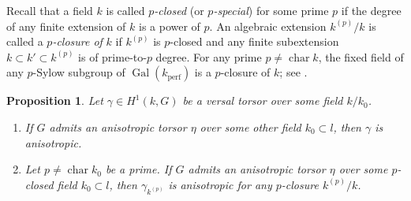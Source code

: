 \documentclass[12pt]{amsart}
\numberwithin{equation}{section}
\newtheorem{proposition}[theorem]{Proposition}
\theoremstyle{definition}
\newcommand{\Gal}{\operatorname{Gal}}
\newcommand{\Char}{\operatorname{char}}
\begin{document}
Recall that a field $k$ is called \emph{$p$-closed} (or \emph{$p$-special}) for some prime $p$ if the degree of any finite extension of $k$ is a power of $p$. An algebraic extension $k^{(p)}/k$ is called a \emph{$p$-closure of }$k$ if $k^{(p)}$ is $p$-closed and any finite subextension $k\subset k'\subset k^{(p)}$ is of prime-to-$p$ degree.  For any prime $p\neq \Char k$, the fixed field of any $p$-Sylow subgroup of $\Gal(k_{\mathrm{perf}})$ is a  $p$-closure of $k$; see \cite[Proposition 101.16]{ekm}.

\begin{proposition}\label{prop.versal_aniso}
    Let $\gamma \in H^1(k,G)$ be a versal torsor over some field $k/k_0$.
    \begin{enumerate}
        \item If $G$ admits an anisotropic torsor $\eta$ over some other field $k_0\subset l$, then $\gamma$ is anisotropic.
        
        \item Let $p\neq \Char k_0$ be a prime. If $G$ admits an anisotropic torsor $\eta$ over some $p$-closed field $k_0\subset l$, then $\gamma_{k^{(p)}}$ is anisotropic for any $p$-closure $k^{(p)}/k$.
    \end{enumerate}
    
\end{proposition}
\end{document}
